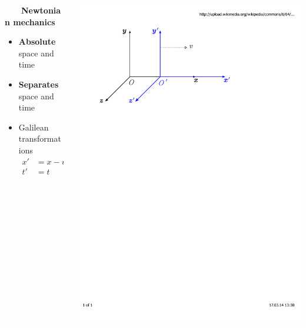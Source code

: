 \documentclass[mathserif,8pt]{beamer}
\begin{document}
\begin{frame}
    \ \\
    \ \\
    \ \\
    \ \\
    \ \\
    \begin{columns}
    \begin{column}{.30\textwidth}
    \ \ \ \ \textbf{Newtonian mechanics}
    \begin{itemize}
	\item \textbf{Absolute} space and time
	\item \textbf{Separates} space and time
	\item Galilean transformations\\
	    \begin{align}
		\nonumber
		x' &= x - vt\\
		\nonumber
		t' &= t
	    \end{align}
    \end{itemize}
    \end{column}
    \begin{column}{.40\textwidth}
	\centering
	\includegraphics[viewport = 50 550 430 800, clip, scale=0.3]{figures/reference_frame.pdf}

\end{column}
\end{columns}
\end{frame}
\end{document}
